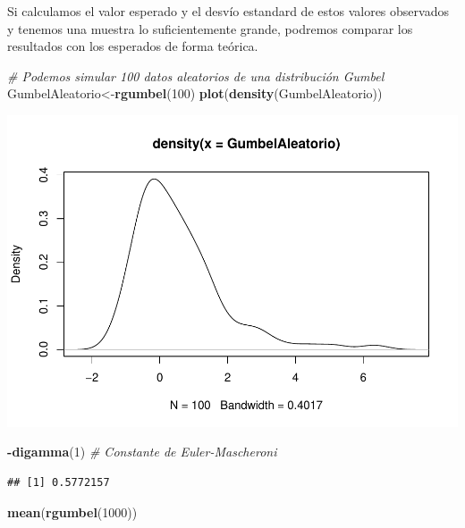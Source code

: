 \documentclass[
  12pt]{article}
\newenvironment{Shaded}{\begin{snugshade}}{\end{snugshade}}
\newcommand{\CommentTok}[1]{\textcolor[rgb]{0.56,0.35,0.01}{\textit{#1}}}
\newcommand{\DecValTok}[1]{\textcolor[rgb]{0.00,0.00,0.81}{#1}}
\newcommand{\FunctionTok}[1]{\textcolor[rgb]{0.13,0.29,0.53}{\textbf{#1}}}
\newcommand{\NormalTok}[1]{#1}
\newcommand{\OtherTok}[1]{\textcolor[rgb]{0.56,0.35,0.01}{#1}}
\newcommand{\SpecialCharTok}[1]{\textcolor[rgb]{0.81,0.36,0.00}{\textbf{#1}}}
\begin{document}
Si calculamos el valor esperado y el desvío estandard de estos valores
observados y tenemos una muestra lo suficientemente grande, podremos
comparar los resultados con los esperados de forma teórica.

\begin{Shaded}
\begin{Highlighting}[]
\CommentTok{\# Podemos simular 100 datos aleatorios de una distribución Gumbel}
\NormalTok{GumbelAleatorio}\OtherTok{\textless{}{-}}\FunctionTok{rgumbel}\NormalTok{(}\DecValTok{100}\NormalTok{)}
\FunctionTok{plot}\NormalTok{(}\FunctionTok{density}\NormalTok{(GumbelAleatorio))}
\end{Highlighting}
\end{Shaded}

\includegraphics{extremales_files/figure-latex/unnamed-chunk-12-1.pdf}

\begin{Shaded}
\begin{Highlighting}[]
\SpecialCharTok{{-}}\FunctionTok{digamma}\NormalTok{(}\DecValTok{1}\NormalTok{) }\CommentTok{\# Constante de Euler{-}Mascheroni}
\end{Highlighting}
\end{Shaded}

\begin{verbatim}
## [1] 0.5772157
\end{verbatim}

\begin{Shaded}
\begin{Highlighting}[]
\FunctionTok{mean}\NormalTok{(}\FunctionTok{rgumbel}\NormalTok{(}\DecValTok{1000}\NormalTok{))}
\end{Highlighting}
\end{Shaded}
\end{document}
